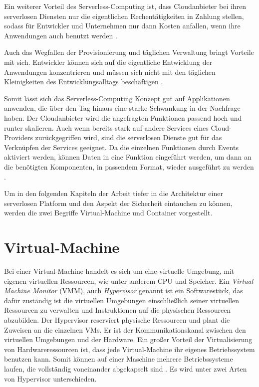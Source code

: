Ein weiterer Vorteil des Serverless-Computing ist, dass Cloudanbieter
bei ihren serverlosen Diensten nur die eigentlichen Rechentätigkeiten
in Zahlung stellen, sodass für Entwickler und Unternehmen nur dann Kosten
anfallen, wenn ihre Anwendungen auch benutzt werden \cite{EcoArc}.

Auch das Wegfallen der Provisionierung und täglichen Verwaltung bringt Vorteile mit sich.
Entwickler können sich auf die eigentliche Entwicklung der Anwendungen konzentrieren und
müssen sich nicht mit den täglichen Kleinigkeiten des Entwicklungsalltags
beschäftigen \cite{ServerlessTrends}.

Somit lässt sich das Serverless-Computing Konzept gut auf Applikationen anwenden,
die über den Tag hinaus eine starke Schwankung in der Nachfrage haben. Der Cloudanbieter wird
die angefragten Funktionen passend hoch und runter skalieren. Auch wenn bereits stark auf 
andere Services eines Cloud-Providers zurückgegriffen wird, sind die serverlosen Dienste
gut für das Verknüpfen der Services geeignet. Da die einzelnen Funktionen durch Events
aktiviert werden, können Daten in eine Funktion eingeführt werden, um
dann an die benötigten Komponenten, in passendem Format, wieder ausgeführt zu werden
\cite{ServerlessTrends} \cite{HpcServerless}.

Um in den folgenden Kapiteln der Arbeit tiefer in die Architektur einer
serverlosen Platform und den Aspekt der Sicherheit eintauchen zu können,
werden die zwei Begriffe Virtual-Machine und Container vorgestellt.

\section{Virtual-Machine}
Bei einer Virtual-Machine handelt es sich um eine virtuelle Umgebung, mit 
eigenen virtuellen Ressourcen, wie unter anderem CPU und Speicher.
Ein \textit{Virtual Machine Monitor} (VMM), auch \textit{Hypervisor} genannt
ist ein Softwarestück, das dafür zuständig ist die 
virtuellen Umgebungen einschließlich seiner virtuellen Ressourcen zu verwalten
und Instruktionen auf die physischen Ressourcen abzubilden.
Der Hypervisor reserviert physische Ressourcen und plant die Zuweisen
an die einzelnen VMs. Er ist der Kommunikationskanal 
zwischen den virtuellen Umgebungen und der Hardware.
Ein großer Vorteil der Virtualisierung von Hardwareressourcen
ist, dass jede Virtual-Machine ihr eigenes Betriebssystem
benutzen kann. Somit können auf einer Maschine
mehrere Betriebssysteme laufen, die vollständig voneinander abgekapselt sind
\cite{RedHatVM} \cite{RedHatHypervisor}. Es wird unter zwei
Arten von Hypervisor unterschieden.

